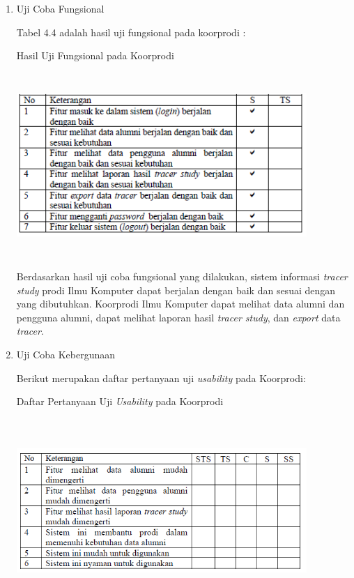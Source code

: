 \begin{enumerate}
	\item Uji Coba Fungsional
	
	Tabel 4.4 adalah hasil uji fungsional pada koorprodi :
	
	\begin{table}[H]
		\centering
		\caption{Hasil Uji Fungsional pada Koorprodi}
		\includegraphics[width=11cm,height=7cm]{gambar/UAT/f_koorprodi}
		\label{f_koorprodi}
	\end{table}
	
	Berdasarkan hasil uji coba fungsional yang dilakukan, sistem informasi
	\textit{tracer study} prodi Ilmu Komputer dapat berjalan dengan baik dan sesuai dengan yang dibutuhkan. Koorprodi Ilmu Komputer dapat melihat data alumni dan pengguna alumni, dapat melihat laporan hasil \textit{tracer study}, dan \textit{export} data \textit{tracer}.
	
	\item Uji Coba Kebergunaan
	
	Berikut merupakan daftar pertanyaan uji \textit{usability} pada Koorprodi:

	\begin{table}[H]
		\centering
		\caption{Daftar Pertanyaan Uji \textit{Usability} pada Koorprodi}
		\includegraphics[width=11cm,height=7cm]{gambar/UAT/u_koorprodi}
		\label{u_koorprodi}
	\end{table}
	

\end{enumerate}
